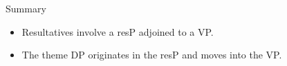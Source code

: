 \documentclass[Proposal]{subfiles}
\begin{document}
%
%
\begin{frame}
  {Summary}
  \begin{itemize}
    \item Resultatives involve a resP adjoined to a VP.
    \item The theme DP originates in the resP and moves into the VP.
  \end{itemize}
\end{frame}
\end{document}
